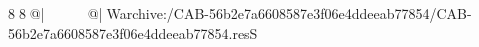 8  8  @|                                                   @| W   archive:/CAB-56b2e7a6608587e3f06e4ddeeab77854/CAB-56b2e7a6608587e3f06e4ddeeab77854.resS 